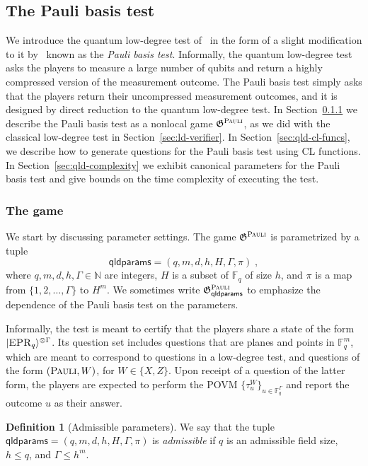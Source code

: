 \documentclass[11pt]{article}
\theoremstyle{definition}
\newtheorem{definition}[theorem]{Definition}
\newcommand{\ket}[1]{|#1\rangle}
\newcommand{\N}{\ensuremath{\mathbb{N}}}
\newcommand{\F}{\ensuremath{\mathbb{F}}}
\newcommand{\game}{\mathfrak{G}}
\newcommand{\gamestyle}[1]{\ensuremath{\textsc{#1}}\xspace}
\newcommand{\pauli}{\gamestyle{Pauli}}
\newcommand{\labelstyle}[1]{\ensuremath{\textsc{#1}}\xspace}
\newcommand{\EPR}{\labelstyle{EPR}}
\newcommand{\typestyle}[1]{\ensuremath{\textsc{#1}}\xspace}
\newcommand{\Pauli}{\typestyle{Pauli}}
\newcommand{\qldparams}{\mathsf{qldparams}}
\begin{document}
\subsection{The Pauli basis test}
\label{sec:pauli-verifier}

We introduce the quantum low-degree test of~\cite{natarajan2018low} in the form
of a slight modification to it by~\cite{NW19} known as the \emph{Pauli basis
  test}.
Informally, the quantum low-degree test asks the players to measure a large
number of qubits and return a highly compressed version of the measurement
outcome.
The Pauli basis test simply asks that the players return their uncompressed
measurement outcomes, and it is designed by direct reduction to the quantum
low-degree test.
In Section~\ref{sec:qld-game} we describe the Pauli basis test as a nonlocal
game $\game^\pauli$, as we did with the classical low-degree test in
Section~\ref{sec:ld-verifier}.
In Section~\ref{sec:qld-cl-funcs}, we describe how to generate questions for the
Pauli basis test using CL functions.
In Section~\ref{sec:qld-complexity} we exhibit canonical parameters for the
Pauli basis test and give bounds on the time complexity of executing the test.

\subsubsection{The game}
\label{sec:qld-game}

We start by discussing parameter settings.
The game $\game^\pauli$ is parametrized by a tuple
\[\qldparams = (q,m,d,h,H,\Gamma,\pi)\;,\] where $q,m,d,h,\Gamma \in \N$ are integers, $H$ is a
subset of $\F_{q}$ of size $h$, and $\pi$ is a map from $\{1, 2, \ldots,
\Gamma\}$ to $H^m$.
We sometimes write $\game^\pauli_\qldparams$ to emphasize the dependence of the
Pauli basis test on the parameters.

Informally, the test is meant to certify that the players share a state of the
form $\ket{\EPR_q}^{\otimes \Gamma}$.
Its question set includes questions that are planes and points in $\F_q^m$,
which are meant to correspond to questions in a low-degree test, and questions
of the form $(\Pauli, W)$, for $W \in \{X, Z\}$.
Upon receipt of a question of the latter form, the players are expected to perform the POVM $\{\tau_u^W\}_{u \in \F_q^{\Gamma}}$ and report the outcome $u$ as
their answer.

\begin{definition}[Admissible parameters]\label{def:admissible}
  We say that the tuple $\qldparams=(q, m, d, h, H, \Gamma, \pi)$ is
  \emph{admissible} if $q$ is an admissible field size, $h \leq q$, and $\Gamma \leq h^m$.
\end{definition}
\end{document}
